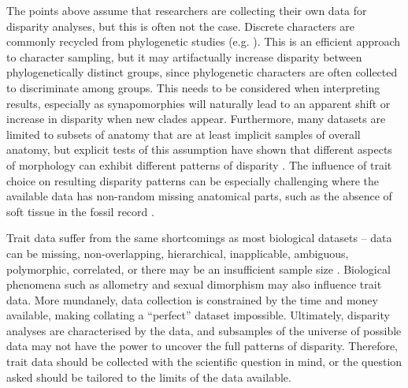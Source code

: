 \documentclass[12pt,letterpaper]{article}
\begin{document}
The points above assume that researchers are collecting their own data for disparity analyses, but this is often not the case.
Discrete characters are commonly recycled from phylogenetic studies (e.g. \citealt{Brusatte2008,Close2015}).
This is an efficient approach to character sampling, but it may artifactually increase disparity between phylogenetically distinct groups, since phylogenetic characters are often collected to discriminate among groups.
This needs to be considered when interpreting results, especially as synapomorphies will naturally lead to an apparent shift or increase in disparity when new clades appear.
Furthermore, many datasets are limited to subsets of anatomy that are at least implicit samples of overall anatomy, but explicit tests of this assumption have shown that different aspects of morphology can exhibit different patterns of disparity \citep{Hopkins2017}.
The influence of trait choice on resulting disparity patterns can be especially challenging where the available data has non-random missing anatomical parts, such as the absence of soft tissue in the fossil record \citep{Deline2018}.

Trait data suffer from the same shortcomings as most biological datasets -- data can be missing, non-overlapping, hierarchical, inapplicable, ambiguous, polymorphic, correlated, or there may be an insufficient sample size \citep{Palci2018}.
Biological phenomena such as allometry and sexual dimorphism may also influence trait data.
More mundanely, data collection is constrained by the time and money available, making collating a ``perfect'' dataset impossible.
Ultimately, disparity analyses are characterised by the data, and subsamples of the universe of possible data may not have the power to uncover the full patterns of disparity.
Therefore, trait data should be collected with the scientific question in mind, or the question asked should be tailored to the limits of the data available.
\end{document}
